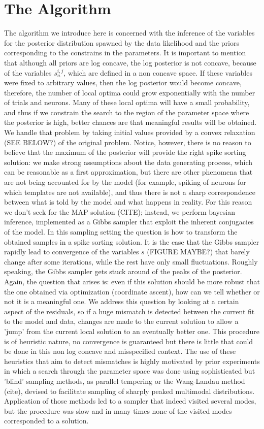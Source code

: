 \documentclass[12pt,letterpaper,fleqn]{article}
\begin{document}
\section{The Algorithm}
The algorithm we introduce here is concerned with the inference of the variables for the posterior distribution spawned by the data likelihood and the priors corresponding to the constrains in the parameters. It is important to mention that although all priors are log concave, the log posterior is not concave, because of the variables $s_n^{i,j}$, which are defined in a non concave space. If these variables were fixed to arbitrary values, then the log posterior would become concave, therefore, the number of local optima could grow exponentially with the number of trials and neurons. Many of these local optima will have a small probability, and thus if we constrain the search to the region of the parameter space where the posterior is high, better chances are that meaningful results will be obtained. We handle that problem by taking initial values provided by a convex relaxation (SEE BELOW?) of the original problem. Notice, however, there is no reason to believe that the maximum of the posterior will provide the right spike sorting solution: we make strong assumptions about the data generating process, which can be reasonable as a first approximation, but there are other phenomena that are not being accounted for by the model (for example, spiking of neurons for which templates are not available), and thus there is not a sharp correspondence between what is told by the model and what happens in reality. For this reason we don't seek for the MAP solution (CITE); instead, we perform bayesian inference, implemented as a Gibbs sampler that exploit the inherent conjugacies of the model. In this sampling setting the question is how to transform the obtained samples in a spike sorting solution. It is the case that the Gibbs sampler rapidly lead to convergence of the variables $s$ (FIGURE MAYBE?) that barely change after some iterations, while the rest have only small fluctuations. Roughly speaking, the Gibbs sampler gets stuck around of the peaks of the posterior. Again, the question that arises is: even if this solution should be more robust that the one obtained via optimization (coordinate ascent), how can we tell whether or not it is a meaningful one. We address this question by looking at a certain aspect of the residuals, so if a huge mismatch is detected between the current fit to the model and data, changes are made to the current solution to allow a 'jump' from the current local solution to an eventually better one. This procedure is of heuristic nature, no convergence is guaranteed but there is little that could be done in this non log concave and misspecified context. The use of these heuristics that aim to detect mismatches is highly motivated by prior experiments in which a search through the parameter space was done using sophisticated but 'blind' sampling methods, as parallel tempering or the Wang-Landau method (cite), devised to facilitate sampling of sharply peaked multimodal distributions. Application of those methods led to a sampler that indeed visited several modes, but the procedure was slow and in many times none of the visited modes corresponded to a solution.
\end{document}
